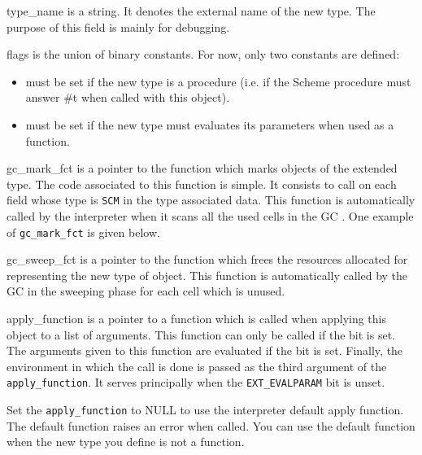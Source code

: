 \documentclass[10pt]{article}
\begin{document}
\begin{Lentry}
\item[type\_name] is a string. It denotes the external name of the new type. The
purpose of this field is mainly for debugging.

\item[flags] is the union of binary constants. For now, only two constants are
defined:
    \begin{itemize}
    \item {} must be set if the new type is a procedure (i.e. if the Scheme
    procedure must answer \#t when called with this object).
    \item {} must be set if the new type must evaluates its parameters
    when used as a function.
    \end{itemize}

\item [gc\_mark\_fct] is a pointer to the function which marks objects of the
extended type. The code associated to this function is simple. It consists to
call  on each field whose type is {\tt SCM} in the type
associated data. This function is automatically called by the interpreter when
it scans all the used cells in the GC .
One example of {\tt gc\_mark\_fct} is given below. 

\item [gc\_sweep\_fct] is a pointer to the function which frees the resources
allocated for representing the new type of object. This function is
automatically called by the GC in the sweeping phase for each cell which is
unused. 

\item [apply\_function] is a pointer to a function which is called when applying
this object to a list of arguments.  This function can only be called if the bit
 is set. The arguments given to this function are 
evaluated if the  bit is set. Finally, the environment in
which the call is done is passed as the third argument of the {\tt
apply\_function}. It serves principally when the {\tt EXT\_EVALPARAM} bit is
unset.

Set the {\tt apply\_function} to NULL to use the interpreter default apply
function. The default function raises an error when called. You can use the
default function when the new type you define is not a function.


\end{Lentry}
\end{document}
